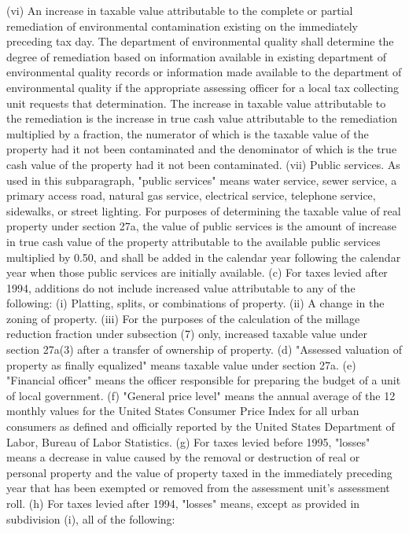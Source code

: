 \documentclass[12pt,\documentclassflag]{michiganCourtOfAppealsBrief}
\begin{document}
  (vi) An increase in taxable value attributable to the complete or partial remediation of environmental contamination existing on the immediately preceding tax day. The department of environmental quality shall determine the degree of remediation based on information available in existing department of environmental quality records or information made available to the department of environmental quality if the appropriate assessing officer for a local tax collecting unit requests that determination. The increase in taxable value attributable to the remediation is the increase in true cash value attributable to the remediation multiplied by a fraction, the numerator of which is the taxable value of the property had it not been contaminated and the denominator of which is the true cash value of the property had it not been contaminated.
  (vii) Public services. As used in this subparagraph, "public services" means water service, sewer service, a primary access road, natural gas service, electrical service, telephone service, sidewalks, or street lighting. For purposes of determining the taxable value of real property under section 27a, the value of public services is the amount of increase in true cash value of the property attributable to the available public services multiplied by 0.50, and shall be added in the calendar year following the calendar year when those public services are initially available.
  (c) For taxes levied after 1994, additions do not include increased value attributable to any of the following:
  (i) Platting, splits, or combinations of property.
  (ii) A change in the zoning of property.
  (iii) For the purposes of the calculation of the millage reduction fraction under subsection (7) only, increased taxable value under section 27a(3) after a transfer of ownership of property.
  (d) "Assessed valuation of property as finally equalized" means taxable value under section 27a.
  (e) "Financial officer" means the officer responsible for preparing the budget of a unit of local government.
  (f) "General price level" means the annual average of the 12 monthly values for the United States Consumer Price Index for all urban consumers as defined and officially reported by the United States Department of Labor, Bureau of Labor Statistics.
  (g) For taxes levied before 1995, "losses" means a decrease in value caused by the removal or destruction of real or personal property and the value of property taxed in the immediately preceding year that has been exempted or removed from the assessment unit's assessment roll.
  (h) For taxes levied after 1994, "losses" means, except as provided in subdivision (i), all of the following:
\end{document}
